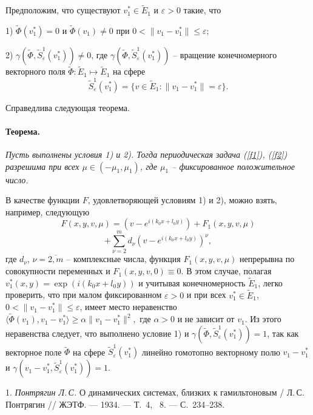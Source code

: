 Предположим, что существуют $v_1^*\in \widetilde{E}_1$ и
$\varepsilon>0$ такие, что

1) $\widetilde{\Phi}(v_1^*)=0$ и $\widetilde{\Phi}(v_1)\neq 0$ при
$0<\|v_1-v_1^*\|\leq\varepsilon$;

2)
$\gamma(\widetilde{\Phi},\widetilde{S}_{\varepsilon}^1(v_1^*))\neq
0$, где
$\gamma(\widetilde{\Phi},\widetilde{S}_{\varepsilon}^1(v_1^*))$ --
вращение конечномерного векторного поля $\widetilde{\Phi} :
\widetilde{E}_1 \mapsto \widetilde{E}_1$ на сфере
$$
 \widetilde{S}_{\varepsilon}^1(v_1^*)= \{v\in \widetilde{E}_1
: \|v_1-v_1^*\|=\varepsilon\}.
$$

Справедлива следующая теорема.

\paragraph{Теорема.}
{\it
	Пусть выполнены условия 1) и 2). Тогда  периодическая задача
(\ref{f1}), (\ref{f2}) разрешима при всех $\mu\in (-\mu_1 ,
\mu_1)$, где $\mu_1$ -- фиксированное положительное число.
}

\vspace{0.3 cm}

В качестве функции $F$, удовлетворяющей условиям 1) и 2),
 можно взять, например, следующую
$$
F(x,y,v,\mu)=\left(v-e^{i(k_0x+l_0y)}\right)+ F_1(x,y,v,\mu)
$$
$$
+\sum_{\nu=2}^m
d_{\nu}\left(v-e^{i(k_0x+l_0y)} \right)^{\nu} ,
$$
где $d_{\nu}$, $\nu=\overline{2, m}$ -- комплексные числа, функция
$F_1(x,y,v,\mu)$ непрерывна по совокупности переменных и
$F_1(x,y,v,0)\equiv 0$. В этом случае, полагая
$v_1^*(x,y)=\exp{(i(k_0x+l_0y))}$ и учитывая конечномерность
$\widetilde{E}_1$, легко проверить, что при малом фиксированном
$\varepsilon>0$ и при всех $v_1^*\in \widetilde{E}_1$,
$0<\|v_1-v_1^*\|\leq\varepsilon$, имеет место неравенство
$
\langle\widetilde{\Phi}(v_1), v_1-v_1^*\rangle  \geq  \alpha
\|v_1-v_1^*\|^2,
$
где $\alpha>0$ и не зависит от $v_1$. Из этого неравенства
следует, что выполнено условие 1) и
$\gamma(\widetilde{\Phi},\widetilde{S}_{\varepsilon}^1(v_1^*))=1$,
так как  векторное поле $\widetilde{\Phi}$ на сфере
$\widetilde{S}_{\varepsilon}^1(v_1^*)$ линейно гомотопно
векторному полю $v_1-v_1^*$ и
$\gamma(v_1-v_1^*,\widetilde{S}_{\varepsilon}^1(v_1^*))=1$.


\vspace{0.3 cm}


\litlist

1. {\it Понтрягин Л.\,С.}
О динамических системах, близких к гамильтоновым  / Л.\,С.
Понтрягин // ЖЭТФ. --- 1934. --- Т.~4, \No~8. --- С.~234--238.

